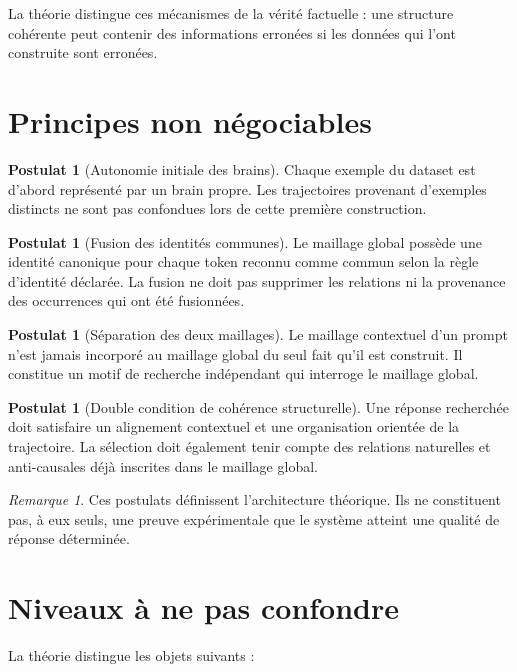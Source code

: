 \documentclass[11pt,a4paper]{report}
\theoremstyle{definition}
\newtheorem{postulat}[definition]{Postulat}
\theoremstyle{plain}
\theoremstyle{remark}
\newtheorem{remarque}[definition]{Remarque}
\begin{document}
La théorie distingue ces mécanismes de la vérité factuelle :
une structure cohérente peut contenir des informations erronées
si les données qui l'ont construite sont erronées.

\section{Principes non négociables}

\begin{postulat}[Autonomie initiale des brains]
Chaque exemple du dataset est d'abord représenté par un brain
propre. Les trajectoires provenant d'exemples distincts ne sont
pas confondues lors de cette première construction.
\end{postulat}

\begin{postulat}[Fusion des identités communes]
Le maillage global possède une identité canonique pour chaque
token reconnu comme commun selon la règle d'identité déclarée.
La fusion ne doit pas supprimer les relations ni la provenance
des occurrences qui ont été fusionnées.
\end{postulat}

\begin{postulat}[Séparation des deux maillages]
Le maillage contextuel d'un prompt n'est jamais incorporé au
maillage global du seul fait qu'il est construit. Il constitue
un motif de recherche indépendant qui interroge le maillage
global.
\end{postulat}

\begin{postulat}[Double condition de cohérence structurelle]
Une réponse recherchée doit satisfaire un alignement contextuel
et une organisation orientée de la trajectoire. La sélection
doit également tenir compte des relations naturelles et
anti-causales déjà inscrites dans le maillage global.
\end{postulat}

\begin{remarque}
Ces postulats définissent l'architecture théorique. Ils ne
constituent pas, à eux seuls, une preuve expérimentale que le
système atteint une qualité de réponse déterminée.
\end{remarque}

\section{Niveaux à ne pas confondre}

La théorie distingue les objets suivants :
\end{document}
